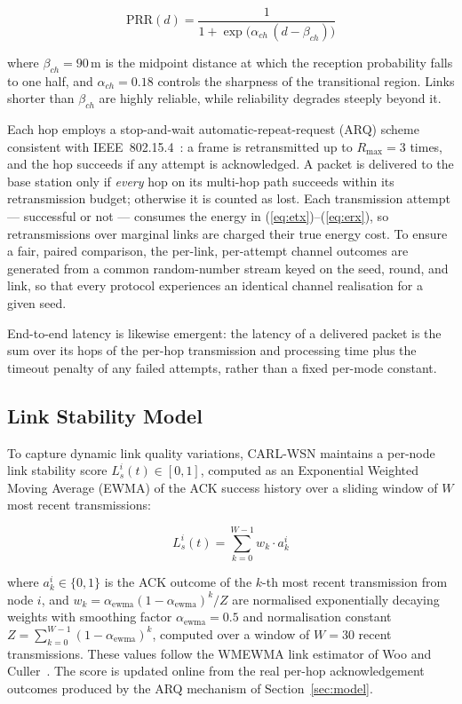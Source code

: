 \documentclass[12pt]{article}
\begin{document}
\begin{equation}
\mathrm{PRR}(d) = \frac{1}{1 + \exp\!\big(\alpha_{ch}\,(d - \beta_{ch})\big)}
\label{eq:prr}
\end{equation}

where $\beta_{ch} = 90$\,m is the midpoint distance at which the
reception probability falls to one half, and $\alpha_{ch} = 0.18$
controls the sharpness of the transitional region. Links shorter than
$\beta_{ch}$ are highly reliable, while reliability degrades steeply
beyond it.

Each hop employs a stop-and-wait automatic-repeat-request (ARQ)
scheme consistent with IEEE~802.15.4~\cite{ieee802154}: a frame is
retransmitted up to $R_{\max} = 3$ times, and the hop succeeds if any
attempt is acknowledged. A packet is delivered to the base station
only if \emph{every} hop on its multi-hop path succeeds within its
retransmission budget; otherwise it is counted as lost. Each
transmission attempt --- successful or not --- consumes the energy in
(\ref{eq:etx})--(\ref{eq:erx}), so retransmissions over marginal
links are charged their true energy cost. To ensure a fair,
paired comparison, the per-link, per-attempt channel outcomes are
generated from a common random-number stream keyed on the seed,
round, and link, so that every protocol experiences an identical
channel realisation for a given seed.

End-to-end latency is likewise emergent: the latency of a delivered
packet is the sum over its hops of the per-hop transmission and
processing time plus the timeout penalty of any failed attempts,
rather than a fixed per-mode constant.

\subsection{Link Stability Model}

To capture dynamic link quality variations, CARL-WSN maintains a
per-node link stability score $L_s^i(t) \in [0, 1]$, computed as an
Exponential Weighted Moving Average (EWMA) of the ACK success history
over a sliding window of $W$ most recent transmissions:

\begin{equation}
L_s^i(t) = \sum_{k=0}^{W-1} w_k \cdot a_k^i
\label{eq:ls}
\end{equation}

where $a_k^i \in \{0, 1\}$ is the ACK outcome of the $k$-th most
recent transmission from node $i$, and
$w_k = \alpha_{\text{ewma}}(1 - \alpha_{\text{ewma}})^k / Z$ are normalised exponentially decaying
weights with smoothing factor $\alpha_{\text{ewma}} = 0.5$ and normalisation
constant $Z = \sum_{k=0}^{W-1}(1 - \alpha_{\text{ewma}})^k$, computed over a window
of $W = 30$ recent transmissions. These values follow the WMEWMA
link estimator of Woo and Culler~\cite{woo2003}. The score is
updated online from the real per-hop acknowledgement outcomes
produced by the ARQ mechanism of Section~\ref{sec:model}.
\end{document}
